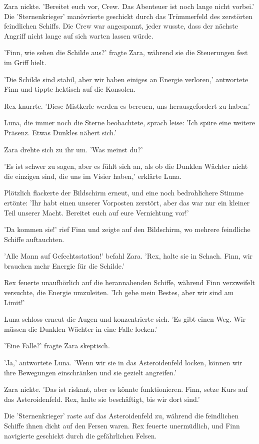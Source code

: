 \documentclass[12pt]{article}
\begin{document}
Zara nickte. 'Bereitet euch vor, Crew. Das Abenteuer ist noch lange nicht vorbei.' Die 'Sternenkrieger' manövrierte geschickt durch das Trümmerfeld des zerstörten feindlichen Schiffs. Die Crew war angespannt, jeder wusste, dass der nächste Angriff nicht lange auf sich warten lassen würde.

'Finn, wie sehen die Schilde aus?' fragte Zara, während sie die Steuerungen fest im Griff hielt.

'Die Schilde sind stabil, aber wir haben einiges an Energie verloren,' antwortete Finn und tippte hektisch auf die Konsolen.

Rex knurrte. 'Diese Mistkerle werden es bereuen, uns herausgefordert zu haben.'

Luna, die immer noch die Sterne beobachtete, sprach leise: 'Ich spüre eine weitere Präsenz. Etwas Dunkles nähert sich.'

Zara drehte sich zu ihr um. 'Was meinst du?'

'Es ist schwer zu sagen, aber es fühlt sich an, als ob die Dunklen Wächter nicht die einzigen sind, die uns im Visier haben,' erklärte Luna.

Plötzlich flackerte der Bildschirm erneut, und eine noch bedrohlichere Stimme ertönte: 'Ihr habt einen unserer Vorposten zerstört, aber das war nur ein kleiner Teil unserer Macht. Bereitet euch auf eure Vernichtung vor!'

'Da kommen sie!' rief Finn und zeigte auf den Bildschirm, wo mehrere feindliche Schiffe auftauchten.

'Alle Mann auf Gefechtsstation!' befahl Zara. 'Rex, halte sie in Schach. Finn, wir brauchen mehr Energie für die Schilde.'

Rex feuerte unaufhörlich auf die herannahenden Schiffe, während Finn verzweifelt versuchte, die Energie umzuleiten. 'Ich gebe mein Bestes, aber wir sind am Limit!'

Luna schloss erneut die Augen und konzentrierte sich. 'Es gibt einen Weg. Wir müssen die Dunklen Wächter in eine Falle locken.'

'Eine Falle?' fragte Zara skeptisch.

'Ja,' antwortete Luna. 'Wenn wir sie in das Asteroidenfeld locken, können wir ihre Bewegungen einschränken und sie gezielt angreifen.'

Zara nickte. 'Das ist riskant, aber es könnte funktionieren. Finn, setze Kurs auf das Asteroidenfeld. Rex, halte sie beschäftigt, bis wir dort sind.'

Die 'Sternenkrieger' raste auf das Asteroidenfeld zu, während die feindlichen Schiffe ihnen dicht auf den Fersen waren. Rex feuerte unermüdlich, und Finn navigierte geschickt durch die gefährlichen Felsen.
\end{document}
